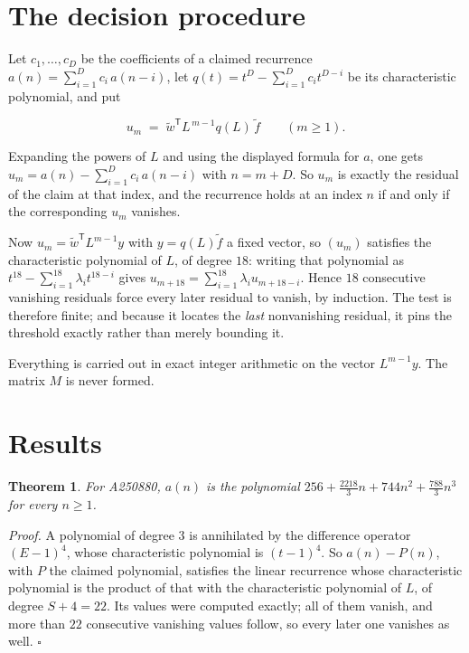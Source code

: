 \documentclass[11pt]{article}
\newtheorem{theorem}{Theorem}
\theoremstyle{definition}
\begin{document}
\section{The decision procedure}

Let $c_1,\dots,c_D$ be the coefficients of a claimed recurrence $a(n) = \sum_{i=1}^{D} c_i\,a(n-i)$, let $q(t) = t^{D} - \sum_{i=1}^{D} c_i t^{D-i}$ be its characteristic polynomial, and put

\[u_m \;=\; \tilde w^{\mathsf T} L^{\,m-1} q(L)\,\tilde f \qquad (m \ge 1).\]

Expanding the powers of $L$ and using the displayed formula for $a$, one gets $u_m = a(n) - \sum_{i=1}^{D} c_i\,a(n-i)$ with $n = m + D$. So $u_m$ is exactly the residual of the claim at that index, and the recurrence holds at an index $n$ if and only if the corresponding $u_m$ vanishes.

Now $u_m = \tilde w^{\mathsf T} L^{m-1} y$ with $y = q(L)\tilde f$ a fixed vector, so $(u_m)$ satisfies the characteristic polynomial of $L$, of degree $18$: writing that polynomial as $t^{18} - \sum_{i=1}^{18} \lambda_i t^{18-i}$ gives $u_{m+18} = \sum_{i=1}^{18} \lambda_i u_{m+18-i}$. Hence $18$ consecutive vanishing residuals force every later residual to vanish, by induction. The test is therefore finite; and because it locates the {\itshape last} nonvanishing residual, it pins the threshold exactly rather than merely bounding it.

Everything is carried out in exact integer arithmetic on the vector $L^{m-1}y$. The matrix $M$ is never formed.

\section{Results}

\begin{theorem} For A250880, $a(n)$ is the polynomial $256 + \frac{2218}{3}n + 744n^{2} + \frac{788}{3}n^{3}$ for every $n \ge 1$.\end{theorem}

{\itshape Proof.} A polynomial of degree $3$ is annihilated by the difference operator $(E-1)^{4}$, whose characteristic polynomial is $(t-1)^{4}$. So $a(n) - P(n)$, with $P$ the claimed polynomial, satisfies the linear recurrence whose characteristic polynomial is the product of that with the characteristic polynomial of $L$, of degree $S + 4 = 22$. Its values were computed exactly; all of them vanish, and more than $22$ consecutive vanishing values follow, so every later one vanishes as well. $\square$
\end{document}
